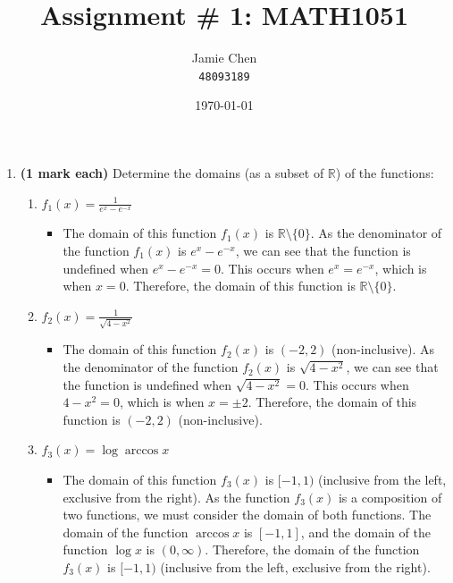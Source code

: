 \documentclass[12pt]{report}
\title{Assignment \# 1: MATH1051}
\author{Jamie Chen\\ \text{Student Number:} \texttt{48093189} \\ \text{Semester 2, 2023}}
\date{\today}
\begin{document}
\maketitle
\begin{enumerate}[leftmargin=\labelsep]

    \item {\bf (1 mark each)} Determine the domains (as a subset of $\mathbb{R}$) of the functions:
        \begin{enumerate}
            \item  $f_1(x)=\frac{1}{e^x-e^{-x}}$
                \begin{tcolorbox}
                    \begin{itemize}[label={}]
                        \item The domain of this function $f_1(x)$ is $\mathbb{R} \setminus \{0\}$. As the denominator of the function $f_1(x)$ is $e^x-e^{-x}$, we can see that the function is undefined when $e^x-e^{-x}=0$. This occurs when $e^x=e^{-x}$, which is when $x=0$. Therefore, the domain of this function is $\mathbb{R} \setminus \{0\}$.
                    \end{itemize}
                \end{tcolorbox}
            \item  $f_2(x)=\frac{1}{\sqrt{4-x^2}}$
                \begin{tcolorbox}
                    \begin{itemize}[label={}]
                        \item The domain of this function $f_2(x)$ is $(-2,2)$ (non-inclusive). As the denominator of the function $f_2(x)$ is $\sqrt{4-x^2}$, we can see that the function is undefined when $\sqrt{4-x^2}=0$. This occurs when $4-x^2=0$, which is when $x=\pm2$. Therefore, the domain of this function is $(-2,2)$ (non-inclusive).
                    \end{itemize}
                \end{tcolorbox}
            \item  $f_3(x)= \log \arccos x$ 
                \begin{tcolorbox}
                    \begin{itemize}[label={}]
                        \item The domain of this function $f_3(x)$ is $[-1,1)$ (inclusive from the left, exclusive from the right). As the function $f_3(x)$ is a composition of two functions, we must consider the domain of both functions. The domain of the function $\arccos x$ is $[-1,1]$, and the domain of the function $\log x$ is $(0,\infty)$. Therefore, the domain of the function $f_3(x)$ is $[-1,1)$ (inclusive from the left, exclusive from the right). 
                    \end{itemize}
                \end{tcolorbox}
        \end{enumerate}
            

\end{enumerate}
\end{document}
